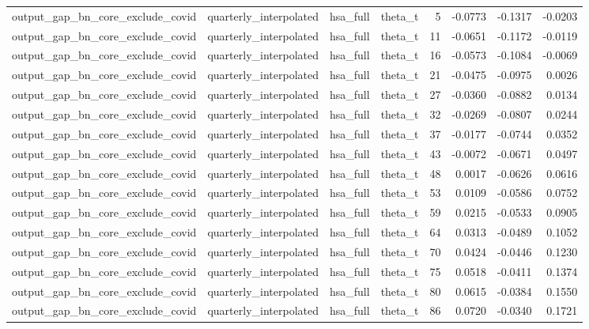 \begin{tabular}{llllrrrr}
output\_gap\_bn\_core\_exclude\_covid & quarterly\_interpolated & hsa\_full & theta\_t & 5 & -0.0773 & -0.1317 & -0.0203 \\
output\_gap\_bn\_core\_exclude\_covid & quarterly\_interpolated & hsa\_full & theta\_t & 11 & -0.0651 & -0.1172 & -0.0119 \\
output\_gap\_bn\_core\_exclude\_covid & quarterly\_interpolated & hsa\_full & theta\_t & 16 & -0.0573 & -0.1084 & -0.0069 \\
output\_gap\_bn\_core\_exclude\_covid & quarterly\_interpolated & hsa\_full & theta\_t & 21 & -0.0475 & -0.0975 & 0.0026 \\
output\_gap\_bn\_core\_exclude\_covid & quarterly\_interpolated & hsa\_full & theta\_t & 27 & -0.0360 & -0.0882 & 0.0134 \\
output\_gap\_bn\_core\_exclude\_covid & quarterly\_interpolated & hsa\_full & theta\_t & 32 & -0.0269 & -0.0807 & 0.0244 \\
output\_gap\_bn\_core\_exclude\_covid & quarterly\_interpolated & hsa\_full & theta\_t & 37 & -0.0177 & -0.0744 & 0.0352 \\
output\_gap\_bn\_core\_exclude\_covid & quarterly\_interpolated & hsa\_full & theta\_t & 43 & -0.0072 & -0.0671 & 0.0497 \\
output\_gap\_bn\_core\_exclude\_covid & quarterly\_interpolated & hsa\_full & theta\_t & 48 & 0.0017 & -0.0626 & 0.0616 \\
output\_gap\_bn\_core\_exclude\_covid & quarterly\_interpolated & hsa\_full & theta\_t & 53 & 0.0109 & -0.0586 & 0.0752 \\
output\_gap\_bn\_core\_exclude\_covid & quarterly\_interpolated & hsa\_full & theta\_t & 59 & 0.0215 & -0.0533 & 0.0905 \\
output\_gap\_bn\_core\_exclude\_covid & quarterly\_interpolated & hsa\_full & theta\_t & 64 & 0.0313 & -0.0489 & 0.1052 \\
output\_gap\_bn\_core\_exclude\_covid & quarterly\_interpolated & hsa\_full & theta\_t & 70 & 0.0424 & -0.0446 & 0.1230 \\
output\_gap\_bn\_core\_exclude\_covid & quarterly\_interpolated & hsa\_full & theta\_t & 75 & 0.0518 & -0.0411 & 0.1374 \\
output\_gap\_bn\_core\_exclude\_covid & quarterly\_interpolated & hsa\_full & theta\_t & 80 & 0.0615 & -0.0384 & 0.1550 \\
output\_gap\_bn\_core\_exclude\_covid & quarterly\_interpolated & hsa\_full & theta\_t & 86 & 0.0720 & -0.0340 & 0.1721 \\

\end{tabular}
